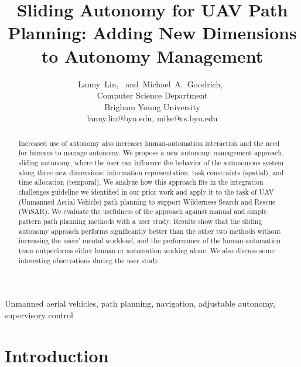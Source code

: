 \documentclass[journal]{IEEEtran}
\begin{document}
\title{Sliding Autonomy for UAV Path Planning: Adding New Dimensions to Autonomy Management}

\author{
Lanny~Lin,~
and~Michael~A.~Goodrich,~%
\\Computer Science Department \\ Brigham Young University \\ lanny.lin@byu.edu, mike@cs.byu.edu
}

\maketitle

\begin{abstract}
Increased use of autonomy also increases human-automation interaction and the need for humans to manage autonomy. We propose a new autonomy management approach, sliding autonomy, where the user can influence the behavior of the autonomous system along three new dimensions: information representation, task constraints (spatial), and time allocation (temporal). We analyze how this approach fits in the integration challenges guideline we identified in our prior work and apply it to the task of UAV (Unmanned Aerial Vehicle) path planning to support Wilderness Search and Rescue (WiSAR). We evaluate the usefulness of the approach against manual and simple pattern path planning methods with a user study. Results show that the sliding autonomy approach performs significantly better than the other two methods without increasing the users' mental workload, and the performance of the human-automation team outperforms either human or automation working alone. We also discuss some interesting observations during the user study.
\end{abstract}


\begin{IEEEkeywords}
Unmanned aerial vehicles, path planning, navigation, adjustable autonomy, supervisory control
\end{IEEEkeywords}

\IEEEpeerreviewmaketitle


\section{Introduction}
\label{sec:Introduction6}
\end{document}
